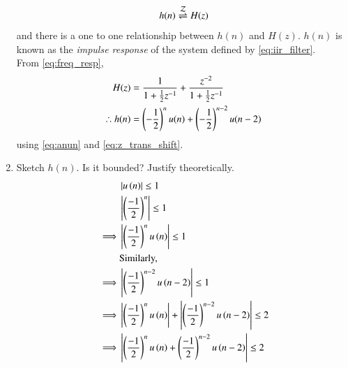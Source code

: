 \documentclass[journal,12pt,twocolumn]{IEEEtran}
\renewcommand\thesection{\arabic{section}}
\begin{document}
\begin{enumerate}[label=\thesection.\arabic*]
\begin{equation}
	\label{eq:impulse_resp}
	h(n) \overset{\mathcal{Z}}{ \rightleftharpoons} H(z)
\end{equation}
and there is a one to one relationship between $h(n)$ and $H(z)$. $h(n)$ is known as the {\em impulse response} of the
system defined by \eqref{eq:iir_filter}.
\\
\solution From \eqref{eq:freq_resp},
\begin{align}
	H(z) &= \frac{1}{1 + \frac{1}{2}z^{-1}} + \frac{ z^{-2}}{1 + \frac{1}{2}z^{-1}}
	\\
	\therefore h(n) &= \left(-\frac{1}{2}\right)^{n}u(n) + \left(-\frac{1}{2}\right)^{n-2}u(n-2)
\end{align}
using \eqref{eq:anun} and \eqref{eq:z_trans_shift}.
\item Sketch $h(n)$. Is it bounded? Justify theoretically.
\\
\solution 
\begin{align}
	&\left\vert u\left(n\right)\right\vert\leq 1\\
	&\left\vert\left(\frac{-1}{2}\right)^n\right\vert\leq 1\\
	\implies &\left\vert\left(\frac{-1}{2}\right)^n u\left(n\right)\right\vert\leq 1\\
	&\text{Similarly,}\\
	\implies &\left\vert\left(\frac{-1}{2}\right)^{n-2} u\left(n-2\right)\right\vert\leq 1\\
	\implies &\left\vert\left(\frac{-1}{2}\right)^n u\left(n\right)\right\vert+\left\vert\left(\frac{-1}{2}\right)^{n-2} u\left(n-2\right)\right\vert \leq 2\\
	\implies &\left\vert\left(\frac{-1}{2}\right)^n u\left(n\right)+\left(\frac{-1}{2}\right)^{n-2} u\left(n-2\right)\right\vert\leq 2
\end{align} 



\end{enumerate}
\end{document}

